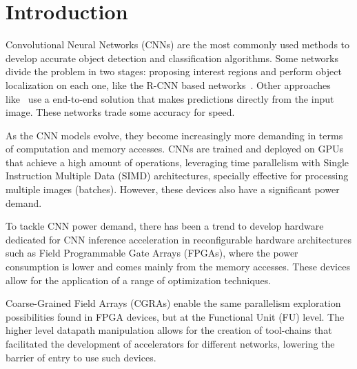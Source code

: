 
\chapter{Introduction}
\label{chapter:introduction}
Convolutional Neural Networks (CNNs) are the most commonly used methods to develop accurate object detection and classification algorithms. Some networks divide the problem in two stages: proposing interest regions and perform object localization on each one, like the R-CNN based networks~\cite{R-CNN, Fast_R-CNN, Faster_R-CNN, FPN_FRCN}. Other approaches like~\cite{Yolov1_DBLP:journals/corr/RedmonDGF15, Yolov2_redmon2016yolo9000, yolov3} use a end-to-end solution that makes predictions directly from the input image. These networks trade some accuracy for speed.

As the CNN models evolve, they become increasingly more demanding in terms of computation and memory accesses. CNNs are trained and deployed on GPUs that achieve a high amount of operations, leveraging time parallelism with Single Instruction Multiple Data (SIMD) architectures, specially effective for processing multiple images (batches). However, these devices also have a significant power demand.

To tackle CNN power demand, there has been a trend to develop hardware dedicated for CNN inference acceleration in reconfigurable hardware architectures such as Field Programmable Gate Arrays (FPGAs), where the power consumption is lower and comes mainly from the memory accesses. These devices allow for the application of a range of optimization techniques.

Coarse-Grained Field Arrays (CGRAs) enable the same parallelism exploration possibilities found in FPGA devices, but at the Functional Unit (FU) level. The higher level datapath manipulation allows for the creation of tool-chains that facilitated the development of accelerators for different networks, lowering the barrier of entry to use such devices.%

